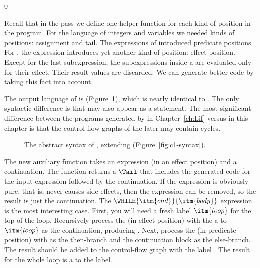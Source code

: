\documentclass[7x10,nocrop]{TimesAPriori_MIT}%
\newcommand{\gray}[1]{{\color{gray} #1}}
\def\racketEd{0}
\def\edition{1}
\begin{document}
{\if\edition\racketEd

Recall that in the  pass we define one helper
function for each kind of position in the program.  For the \LangVar{}
language of integers and variables we needed kinds of positions:
assignment and tail. The  expressions of \LangIf{} introduced
predicate positions. For \LangLoop{}, the  expression introduces
yet another kind of position: effect position. Except for the last
subexpression, the subexpressions inside a  are evaluated
only for their effect. Their result values are discarded. We can
generate better code by taking this fact into account.

The output language of  is \LangCLoop{}
(Figure~\ref{fig:c7-syntax}), which is nearly identical to
\LangCIf{}. The only syntactic difference is that  may also
appear as a statement.  The most significant difference between the
programs generated by  in
Chapter~\ref{ch:Lif} versus  in this chapter
is that the control-flow graphs of the later may contain cycles.

\begin{figure}[tp]
\fbox{
\begin{minipage}{0.96\textwidth}
\small
\[
\begin{array}{l}
  \gray{\CvarASTRacket} \\ \hline
  \gray{\CifASTRacket} \\ \hline
  \CloopASTRacket \\
\begin{array}{lcl}
\LangCLoopM{} & ::= & \CPROGRAM{\itm{info}}{\LP\LP\itm{label}\,\key{.}\,\Tail\RP\ldots\RP}
\end{array}
\end{array}
\]
\end{minipage}
}
\caption{The abstract syntax of \LangCLoop{}, extending \LangCIf{} (Figure~\ref{fig:c1-syntax}).}
\label{fig:c7-syntax}
\end{figure}

The new auxiliary function  takes an
expression (in an effect position) and a continuation. The function
returns a $\Tail$ that includes the generated code for the input
expression followed by the continuation. If the expression is
obviously pure, that is, never causes side effects, then the
expression can be removed, so the result is just the continuation.
%
The $\WHILE{\itm{cnd}}{\itm{body}}$ expression is the most interesting
case.  First, you will need a fresh label $\itm{loop}$ for the top of
the loop.  Recursively process the  (in effect position)
with the a  to $\itm{loop}$ as the continuation, producing
. Next, process the  (in predicate position) with
 as the then-branch and the continuation block as the
else-branch. The result should be added to the control-flow graph with
the label . The result for the whole  loop is a
 to the  label.

}
\end{document}
